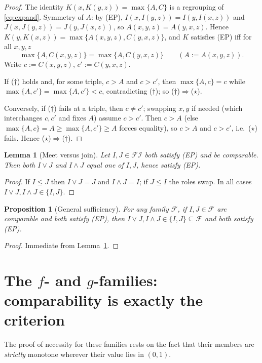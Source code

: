 \documentclass{amsart}
\theoremstyle{plain}
\newtheorem{lemma}{Lemma}
\newtheorem{proposition}{Proposition}
\theoremstyle{definition}
\newcommand{\FI}{\mathcal{FI}}
\newcommand{\Fcal}{\mathcal{F}}
\begin{document}
\begin{proof}
The identity $K(x,K(y,z))=\max\{A,C\}$ is a regrouping of \eqref{eq:expand}.
Symmetry of $A$: by (EP), $I(x,I(y,z))=I(y,I(x,z))$ and $J(x,J(y,z))=J(y,J(x,z))$, so
$A(x,y,z)=A(y,x,z)$.  Hence $K(y,K(x,z))=\max\{A(x,y,z),C(y,x,z)\}$, and $K$ satisfies (EP)
iff for all $x,y,z$
\[
\max\{A,C(x,y,z)\}=\max\{A,C(y,x,z)\}\qquad(A:=A(x,y,z)).
\tag{$\dagger$}
\]
Write $c:=C(x,y,z)$, $c':=C(y,x,z)$.

If ($\dagger$) holds and, for some triple, $c>A$ and $c>c'$, then $\max\{A,c\}=c$ while
$\max\{A,c'\}=\max\{A,c'\}<c$, contradicting ($\dagger$); so ($\dagger$)$\Rightarrow$($\star$).

Conversely, if ($\dagger$) fails at a triple, then $c\ne c'$; swapping $x,y$ if needed
(which interchanges $c,c'$ and fixes $A$) assume $c>c'$.  Then $c>A$ (else
$\max\{A,c\}=A\ge\max\{A,c'\}\ge A$ forces equality), so $c>A$ and $c>c'$, i.e.\ ($\star$)
fails. Hence ($\star$)$\Rightarrow$($\dagger$).
\end{proof}

\begin{lemma}[Meet versus join]\label{lem:meet}
Let $I,J\in\FI$ both satisfy \textup{(EP)} and be comparable.  Then both $I\vee J$ and
$I\wedge J$ equal one of $I,J$, hence satisfy \textup{(EP)}.
\end{lemma}

\begin{proof}
If $I\le J$ then $I\vee J=J$ and $I\wedge J=I$; if $J\le I$ the roles swap.  In all cases
$I\vee J,I\wedge J\in\{I,J\}$.
\end{proof}

\begin{proposition}[General sufficiency]\label{prop:suff}
For \emph{any} family $\Fcal$, if $I,J\in\Fcal$ are comparable and both satisfy
\textup{(EP)}, then $I\vee J,I\wedge J\in\{I,J\}\subseteq\Fcal$ and both satisfy
\textup{(EP)}.
\end{proposition}

\begin{proof}
Immediate from Lemma~\ref{lem:meet}.
\end{proof}

\section{The $f$- and $g$-families: comparability is exactly the criterion}\label{sec:fg}

The proof of necessity for these families rests on the fact that their members are
\emph{strictly} monotone wherever their value lies in $(0,1)$.
\end{document}
